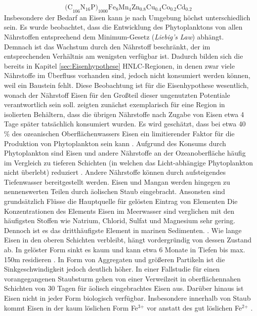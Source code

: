 \documentclass[12pt,a4paper,onecolumn,draft]{scrartcl}
\begin{document}
\begin{equation}
\text{(C}_{106} \text{N}_{16} \text{P)}_{1000} \text{Fe}_8\text{Mn}_4\text{Zn}_{0.8}\text{Cu}_{0.4}\text{Co}_{0.2} \text{Cd}_{0.2}
\end{equation}
Insbesondere der Bedarf an Eisen kann je nach Umgebung höchst unterschiedlich sein. Es wurde beobachtet, dass die Entwicklung des Phytoplanktons von allen Nährstoffen entsprechend dem Minimum-Gesetz (\textit{Liebig's Law}) abhängt. Demnach ist das Wachstum durch den Nährstoff beschränkt, der im entsprechenden Verhältnis am wenigsten verfügbar ist. Dadurch bilden sich die bereits in Kapitel \ref{sec:Eisenhypothese} HNLC-Regionen, in denen zwar viele Nährstoffe im Überfluss vorhanden sind, jedoch nicht konsumiert werden können, weil ein Baustein fehlt. Diese Beobachtung ist für die Eisenhypothese wesentlich, wonach der Nährstoff Eisen für den Großteil dieser ungenutzten Potentiale verantwortlich sein soll. \citet{Martin.1988} zeigten zunächst exemplarisch für eine Region in isolierten Behältern, dass die übrigen Nährstoffe nach Zugabe von Eisen etwa 4 Tage später tatsächlich konsumiert wurden. Es wird geschätzt, dass bei etwa 40 \% des ozeanischen Oberflächenwassers Eisen ein limitierender Faktor für die Produktion von Phytoplankton sein kann \citep{Emerson.2009}. Aufgrund des Konsums durch Phytoplankton sind Eisen und andere Nährstoffe  an der Ozeanoberfläche häufig im Vergleich zu tieferen Schichten (in welchen das Licht-abhängige Phytoplankton nicht überlebt) reduziert \citep{Martin.1990}. Andere Nährstoffe  können durch aufsteigendes Tiefenwasser bereitgestellt werden. Eisen und Mangan werden hingegen zu nennenswerten Teilen durch äolischen Staub eingebracht. Ansonsten sind grundsätzlich Flüsse die Hauptquelle für gelösten Eintrag von Elementen \citep{Emerson.2009} Die Konzentrationen des Elements Eisen im Meerwasser sind verglichen mit den häufigsten Stoffen wie Natrium, Chlorid, Sulfat und Magnesium sehr gering. Dennoch ist es das dritthäufigste Element in marinen Sedimenten. \citep{Emerson.2009}. Wie lange Eisen in den oberen Schichten verbleibt, hängt vordergründig von dessen Zustand ab. In gelöster Form sinkt es kaum und kann etwa 6 Monate in Tiefen bis max. 150m residieren \citep{Hayes.2015}. In Form von Aggregaten und größeren Partikeln ist die Sinkgeschwindigkeit jedoch deutlich höher. In einer Fallstudie für einen vorangegangenen Staubsturm gehen \citet{Boyd.2010} von einer Verweilzeit in oberflächennahen Schichten von 30 Tagen für äolisch eingebrachtes Eisen aus. Darüber hinaus ist Eisen nicht in jeder Form biologisch verfügbar. Insbesondere innerhalb von Staub kommt Eisen in der kaum löslichen Form Fe$^\text{3+}$ vor anstatt des gut löslichen Fe$^\text{2+}$ \citep{Reynolds.2014}. \\
\end{document}
